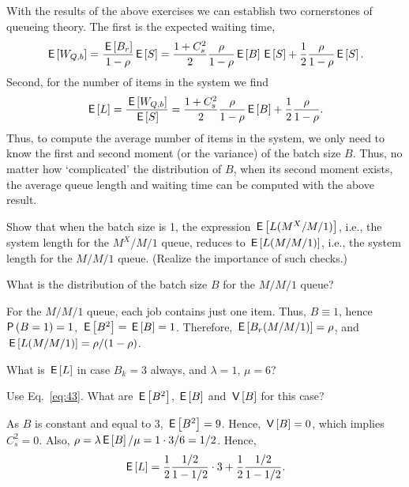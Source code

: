 With the results of the above exercises we can establish two cornerstones of queueing theory. The first is the expected waiting time, 
\begin{equation}
\,\mathsf{E}\left[W_{Q,b}\right] = \frac{\,\mathsf{E}\left[B_r\right]}{1-\rho} \,\mathsf{E}\left[S\right] = 
\frac{1+C_s^2}2 \frac{\rho}{1-\rho} \,\mathsf{E}\left[B\right] \,\mathsf{E}\left[S\right] + \frac12\frac\rho{1-\rho}\,\mathsf{E}\left[S\right].
\end{equation}
Second, for the number of items in the system we find
\begin{equation}\label{eq:43}
\,\mathsf{E}\left[L\right]  =\frac{\,\mathsf{E}\left[W_{Q,b}\right]}{\,\mathsf{E}\left[S\right]} =  
\frac{1+C_s^2}2 \frac{\rho}{1-\rho} \,\mathsf{E}\left[B\right] + \frac12\frac\rho{1-\rho}.
\end{equation}
Thus, to compute the average number of items in the system, we only
need to know the first and second moment (or the variance) of the
batch size $B$. Thus, no matter how `complicated' the distribution of
$B$, when its second moment exists, the average queue length and
waiting time can be computed with the above result. 

\begin{exercise}
  Show that  when the batch size is 1, the expression $\,\mathsf{E}\left[L(M^X/M/1)\right]$, i.e., the system length for the $M^X/M/1$ queue, reduces to
  $\,\mathsf{E}\left[L(M/M/1)\right]$, i.e., the system length for the $M/M/1$ queue. 
(Realize the importance of such checks.)
  \begin{hint}
What is the    distribution of the batch size $B$ for the $M/M/1$ queue?
  \end{hint}
  \begin{solution}
    For the $M/M/1$ queue, each job contains just one item. Thus,
    $B\equiv 1$, hence $\P{B=1}=1$, $\,\mathsf{E}\left[B^2\right]=\,\mathsf{E}\left[B\right] =1$. Therefore,
    $\,\mathsf{E}\left[B_r(M/M/1)\right]= \rho$, and $\,\mathsf{E}\left[L(M/M/1)\right]=\rho/(1-\rho)$. 
  \end{solution}
\end{exercise}


\begin{exercise}
  What is $\,\mathsf{E}\left[L\right]$ in case $B_k=3$ always, and $\lambda=1$, $\mu=6$?  
  \begin{hint}
Use Eq.~\ref{eq:43}. What are $\,\mathsf{E}\left[B^2\right]$, $\,\mathsf{E}\left[B\right]$ and $\,\mathsf{V}\left[B\right]$ for this case?
  \end{hint}
\begin{solution}
  As $B$ is constant and equal to 3, $\,\mathsf{E}\left[B^2\right]=9$. Hence, $\,\mathsf{V}\left[B\right]=0$, which implies
 $C_s^2=0$.  Also, $\rho=\lambda\,\mathsf{E}\left[B\right]/\mu=1\cdot 3/6=1/2$. Hence,
  \begin{equation*}
    \,\mathsf{E}\left[L\right] = \frac 1 2 \frac{1/2}{1-1/2}\cdot 3 + \frac12\frac{1/2}{1-1/2}.
  \end{equation*}
  \end{solution}
\end{exercise}

